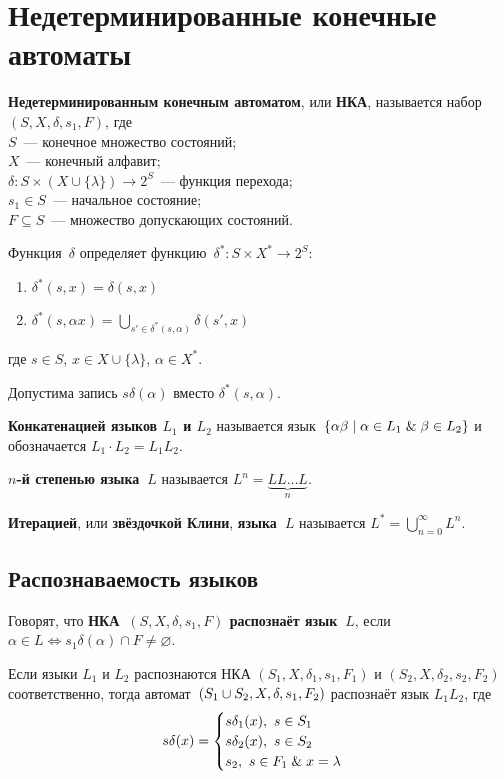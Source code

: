 \section{Недетерминированные конечные автоматы}
  \textbf{Недетерминированным конечным автоматом}, или \textbf{НКА}, называется набор~$(S, X, \delta, s_1, F)$, где\\
$S$~--- конечное множество состояний;\\
$X$~--- конечный алфавит;\\
$\delta \colon S \times (X \cup \{ \lambda \}) \to 2^S$~--- функция перехода;\\
$s_1 \in S$~--- начальное состояние;\\
$F \subseteq S$~--- множество допускающих состояний.

Функция~$\delta$ определяет функцию~$\delta^* \colon S \times X^* \to 2^S$:
\begin{enumerate}
	\item $\delta^*(s, x) = \delta(s, x)$
	\item $\delta^*(s, \alpha x) = \bigcup\limits_{s' \in \delta^*(s, \alpha)} \delta(s', x)$
\end{enumerate}
где $s \in S$, $x \in X \cup \{ \lambda \}$, $\alpha \in X^*$.

Допустима запись $s \delta(\alpha)$ вместо $\delta^*(s, \alpha)$.

 \textbf{Конкатенацией языков $L_1$ и $L_2$} называется язык~$\{ \alpha \beta \mid \alpha \in L_1 \mathrel{\&} \beta \in L_2 \}$ и обозначается $L_1 \cdot L_2 = L_1 L_2$.

 \textbf{$n$-й степенью языка~$L$} называется $L^n = \underbrace{L L \ldots L}_n$.

  \textbf{Итерацией}, или \textbf{звёздочкой Клини}, \textbf{языка~$L$} называется $L^* = \bigcup\limits_{n=0}^\infty L^n$.

\subsection{Распознаваемость языков}
Говорят, что \textbf{НКА~$(S, X, \delta, s_1, F)$ распознаёт язык~$L$}, если $\alpha \in L \Leftrightarrow s_1 \delta(\alpha) \cap F \neq \varnothing$.

Если языки $L_1$ и $L_2$ распознаются НКА $(S_1, X, \delta_1, s_1, F_1)$ и $(S_2, X, \delta_2, s_2, F_2)$ соответственно, тогда автомат~$(S_1 \opbr\cup S_2, \allowbreak X, \allowbreak \delta, \allowbreak s_1, \allowbreak F_2)$ распознаёт язык $L_1 L_2$, где
\begin{equation*}
s \delta(x) =
\begin{cases}
s \delta_1(x), \ s \in S_1 \\
s \delta_2(x), \ s \in S_2 \\
s_2, \ s \in F_1 \mathrel{\&} x = \lambda
\end{cases}
\end{equation*}


